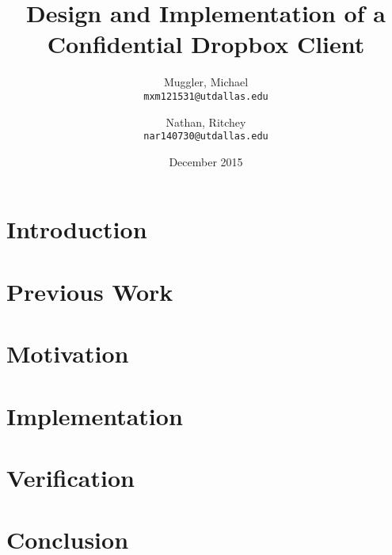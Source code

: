 \documentclass[11pt]{article}
\title{Design and Implementation of a Confidential Dropbox Client}
\author{
  Muggler, Michael\\
  \texttt{mxm121531@utdallas.edu}
  \and
  Nathan, Ritchey\\
  \texttt{nar140730@utdallas.edu}
}
\date{December 2015}
\begin{document}
\maketitle

\section{Introduction}

\section{Previous Work}

\section{Motivation}

\section{Implementation}

\section{Verification}

\section{Conclusion}
\end{document}
